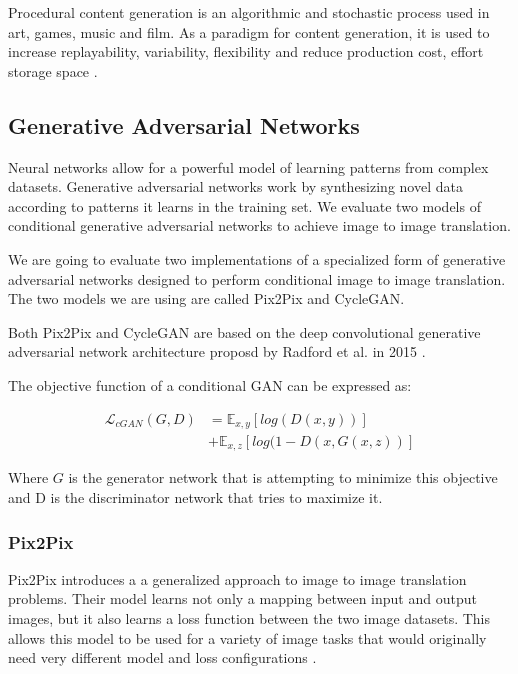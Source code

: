 \documentclass[twocolumn]{article}
\begin{document}
	Procedural content generation is an algorithmic and stochastic process used in art, games, music and film. As a paradigm for content generation, it is used to increase replayability, variability, flexibility and reduce production cost, effort storage space \cite{summerville2017procedural}.

	\subsection{Generative Adversarial Networks}
	
	Neural networks allow for a powerful model of learning patterns from complex datasets. Generative adversarial networks work by synthesizing novel data according to patterns it learns in the training set. We evaluate two models of conditional generative adversarial networks to achieve image to image translation.
	
	We are going to evaluate two implementations of a specialized form of generative adversarial networks designed to perform conditional image to image translation. The two models we are using are called Pix2Pix and CycleGAN.
	
	Both Pix2Pix and CycleGAN are based on the deep convolutional generative adversarial network architecture proposd by Radford et al. in 2015 \cite{radford2015unsupervised}.
	
	The objective function of a conditional GAN can be expressed as:
	
	\begin{align*}
		\mathcal{L}_{cGAN}(G, D) &= \mathbb{E}_{x,y}[log(D(x, y))] \\
		&+ \mathbb{E}_{x,z}[log(1 - D(x, G(x, z))]
	\end{align*}
	
	Where $G$ is the generator network that is attempting to minimize this objective and D is the discriminator network that tries to maximize it.
	
	\subsubsection{Pix2Pix}	
	
	Pix2Pix introduces a a generalized approach to image to image translation problems.  Their model learns not only a mapping between input and output images, but it also learns a loss function between the two image datasets. This allows this model to be used for a variety of image tasks that would originally need very different model and loss configurations \cite{isola2016imagetoimage}.
	
\end{document}
